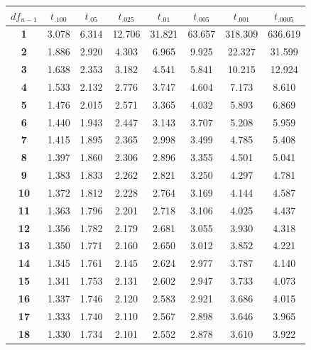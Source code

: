 \begin{center}
\small
\begin{tabular}{c|c|c|c|c|c|c|c}
\hline
\multicolumn{1}{c}{$df_{n-1}$} & \multicolumn{1}{c}{$t_{.100}$} & \multicolumn{1}{c}{$t_{.05}$}  & \multicolumn{1}{c}{$t_{.025}$}  & \multicolumn{1}{c}{$t_{.01}$}   & \multicolumn{1}{c}{$t_{.005}$}  & \multicolumn{1}{c}{$t_{.001}$}   & \multicolumn{1}{c}{$t_{.0005}$}  \tstrut\bstrut\\
\hline
\textbf{1}  & 3.078 & 6.314 & 12.706 & 31.821 & 63.657 & 318.309 & 636.619 \tstrut\\
\textbf{2}  & 1.886 & 2.920 & 4.303  & 6.965  & 9.925  & 22.327  & 31.599  \\
\textbf{3}  & 1.638 & 2.353 & 3.182  & 4.541  & 5.841  & 10.215  & 12.924  \\
\textbf{4}  & 1.533 & 2.132 & 2.776  & 3.747  & 4.604  & 7.173   & 8.610   \\
\textbf{5}  & 1.476 & 2.015 & 2.571  & 3.365  & 4.032  & 5.893   & 6.869   \\
\textbf{6}  & 1.440 & 1.943 & 2.447  & 3.143  & 3.707  & 5.208   & 5.959   \\
\textbf{7}  & 1.415 & 1.895 & 2.365  & 2.998  & 3.499  & 4.785   & 5.408   \\
\textbf{8}  & 1.397 & 1.860 & 2.306  & 2.896  & 3.355  & 4.501   & 5.041   \\
\textbf{9}  & 1.383 & 1.833 & 2.262  & 2.821  & 3.250  & 4.297   & 4.781   \\
\textbf{10} & 1.372 & 1.812 & 2.228  & 2.764  & 3.169  & 4.144   & 4.587   \\
\textbf{11} & 1.363 & 1.796 & 2.201  & 2.718  & 3.106  & 4.025   & 4.437   \\
\textbf{12} & 1.356 & 1.782 & 2.179  & 2.681  & 3.055  & 3.930   & 4.318   \\
\textbf{13} & 1.350 & 1.771 & 2.160  & 2.650  & 3.012  & 3.852   & 4.221   \\
\textbf{14} & 1.345 & 1.761 & 2.145  & 2.624  & 2.977  & 3.787   & 4.140   \\
\textbf{15} & 1.341 & 1.753 & 2.131  & 2.602  & 2.947  & 3.733   & 4.073   \\
\textbf{16} & 1.337 & 1.746 & 2.120  & 2.583  & 2.921  & 3.686   & 4.015   \\
\textbf{17} & 1.333 & 1.740 & 2.110  & 2.567  & 2.898  & 3.646   & 3.965   \\
\textbf{18} & 1.330 & 1.734 & 2.101  & 2.552  & 2.878  & 3.610   & 3.922   \\

\end{tabular}
\end{center}
